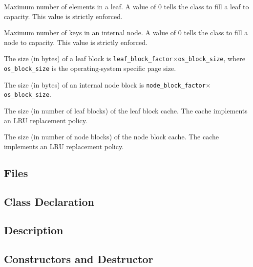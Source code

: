    {Maximum number of elements in a leaf. A
  value of $0$ tells the class to fill a leaf to capacity. This value is
  strictly enforced.}

   {Maximum number of keys in an internal
  node. A value of $0$ tells the class to fill a node to capacity. This
  value is strictly enforced.}

   {The size (in bytes) of a leaf block
  is \lstinline|leaf_block_factor|$\times$\lstinline|os_block_size|, where \lstinline|os_block_size| is the operating-system specific page size.}

   {The size (in bytes) of an internal
  node block is \lstinline|node_block_factor|$\times$\lstinline|os_block_size|.}

   {The size (in number of leaf blocks) of
  the leaf block cache. The cache implements an LRU replacement policy.}

   {The size (in number of node blocks) of
  the node block cache. The cache implements an LRU replacement policy.}

\etabb
{}


\subsection{Files}
   \btabb
       {}
   \etabb

\subsection{Class Declaration}
   \btabb
       {}
   \etabb

\subsection{Description}

\subsection{Constructors and Destructor}
   \btabb
   \etabb


